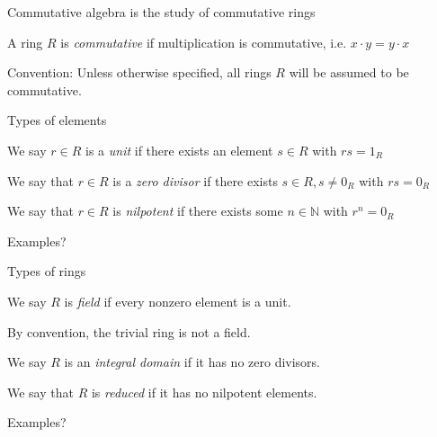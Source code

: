 \documentclass{beamer}
\begin{document}
\begin{frame}{Commutative algebra is the study of commutative rings}

\begin{definition}
A ring $R$ is \emph{commutative} if multiplication is commutative, i.e. $x\cdot y=y\cdot x$
\end{definition}

\begin{block}{Convention:}
Unless otherwise specified, all rings $R$ will be assumed to be commutative.
\end{block}
\end{frame}



\begin{frame}{Types of elements}


\begin{definition}
We say $r\in R$ is a \emph{unit} if there exists an element $s\in R$ with $rs=1_R$
\end{definition}

\begin{definition}
We say that $r\in R$ is a \emph{zero divisor} if there exists $s\in R, s\neq 0_R$ with $rs=0_R$
\end{definition}

\begin{definition}
We say that $r\in R$ is \emph{nilpotent} if there exists some $n\in\mathbb{N}$ with $r^n=0_R$
\end{definition}

\begin{block}{Examples?}
 \end{block}

\end{frame}


\begin{frame}{Types of rings}

\begin{definition}
We say $R$ is \emph{field} if every nonzero element is a unit.
\end{definition}
By convention, the trivial ring is not a field.
\begin{definition}
We say $R$ is an \emph{integral domain} if it has no zero divisors.
\end{definition}

\begin{definition}
We say that $R$ is \emph{reduced} if it has no nilpotent elements.
\end{definition}

\begin{block}{Examples?}
\end{block}

\end{frame}
\end{document}
